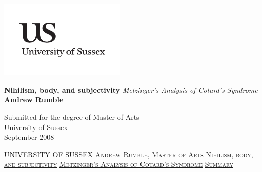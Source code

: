 \documentclass[a4paper,11pt]{report}
\newcommand{\linespacing}{1.5}
\renewcommand{\baselinestretch}{\linespacing}
\begin{document}




\thispagestyle{empty}
\begin{flushright}
\includegraphics[width=6cm]{uslogo}
\end{flushright}	
\vskip40mm
\begin{center}
\huge\textbf{Nihilism, body, and subjectivity}
\vskip2mm
\LARGE\textit{Metzinger's Analysis of Cotard's Syndrome}
\vskip5mm
\Large\textbf{Andrew Rumble}
\normalsize
\end{center}
\vfill
\begin{flushleft}
\large
Submitted for the degree of Master of Arts \\
University of Sussex	\\
September 2008
\end{flushleft}		


\thispagestyle{empty}
\newpage
\null\vskip10mm
\begin{center}
\large
\underline{UNIVERSITY OF SUSSEX}
\vskip20mm
\textsc{Andrew Rumble, Master of Arts}
\vskip20mm
\underline{\textsc{Nihilism, body, and subjectivity}}
\vskip0mm
\underline{\textsc{Metzinger's Analysis of Cotard's Syndrome}}
\vskip20mm
\underline{\textsc{Summary}}
\vskip2mm
\end{center}
\renewcommand{\baselinestretch}{1.0}
\small\normalsize

\end{document}
